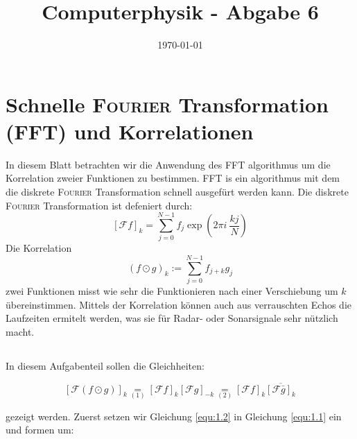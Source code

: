 \documentclass[ngerman]{scrartcl}
\title{Computerphysik - Abgabe 6}
\date{\today}
\begin{document}
	\setcounter{section}{9}
	\thispagestyle{fancy}
	\renewcommand{\thesection}{H.\arabic{section}:}
	\renewcommand{\thesubsection}{H\arabic{section}.\arabic{subsection}}
	
\section{Schnelle \textsc{Fourier} Transformation (FFT) und Korrelationen}
In diesem Blatt betrachten wir die Anwendung des FFT algorithmus
um die Korrelation zweier Funktionen zu bestimmen.
FFT is ein algorithmus mit dem die diskrete \textsc{Fourier} Transformation
schnell ausgef\"urt werden kann. Die diskrete \textsc{Fourier} Transformation
ist defeniert durch:
\begin{equation}
	\label{equ:1.1}
		[\mathcal{F} f]_{k}=\sum_{j=0}^{N-1} f_{j} \exp (2 \pi i ~\frac{kj}{N})
	\end{equation}
Die Korrelation
\begin{equation}
	\label{equ:1.2}
	(f \odot g)_{k}:=\sum_{j=0}^{N-1} f_{j+k} g_{j}
\end{equation}
zwei Funktionen misst wie sehr die Funktionieren
nach einer Verschiebung um $k$ \"ubereinstimmen.
Mittels der Korrelation k\"onnen
auch aus verrauschten Echos die Laufzeiten ermitelt werden, 
was sie f\"ur Radar- oder Sonarsignale sehr n\"utzlich macht.
\subsection{}
In diesem Aufgabenteil sollen die Gleichheiten:

\begin{equation}
\label{equ:1.3}
	[\mathcal{F}(f \odot g)]_{k} \underset{(1)}{=} [\mathcal{F} f]_{k}[\mathcal{F} g]_{-k} \underset{(2)}{=} [\mathcal{F} f]_{k} \overline{[\mathcal{F} \bar{g}]_{k}}
\end{equation}

gezeigt werden.
Zuerst setzen wir Gleichung \ref{equ:1.2}
in Gleichung \ref{equ:1.1} ein und formen um:
\end{document}
